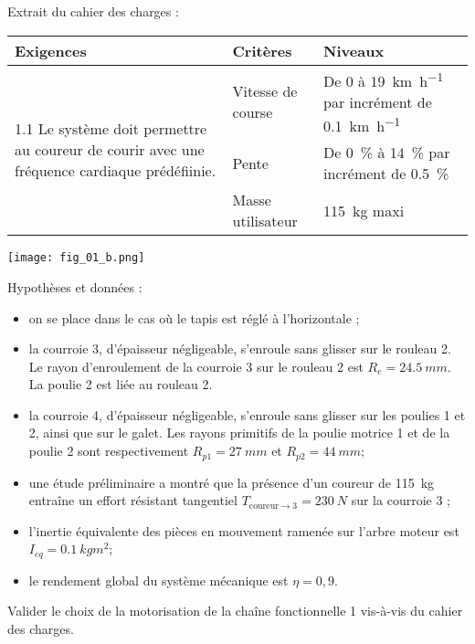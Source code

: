 
Extrait du cahier des charges :
\begin{table*}[!h]
\centering
\begin{tabular}{p{6cm}p{3cm}p{7cm}}
\hline
\textbf{Exigences} & \textbf{Critères} & \textbf{Niveaux} \\
\hline
\multirow{3}{6cm}{1.1 Le système doit permettre au coureur de courir avec une fréquence cardiaque prédéfiinie.} &
Vitesse de course & De 0 à \SI{19}{km.h^{-1}} par incrément de \SI{0,1}{km.h^{-1}}   \\
& Pente & De 0\, \% à \SI{14}{\%} par incrément de \SI{0,5}{\%}   \\
& Masse utilisateur & \SI{115}{kg} maxi \\
\hline
\end{tabular}
\end{table*}

\begin{marginfigure} 
\texttt{[image: fig\_01\_b.png]}
\end{marginfigure}
Hypothèses et données :
\begin{itemize}
\item on se place dans le cas où le tapis est réglé à l’horizontale ;
\item la courroie 3, d’épaisseur négligeable, s’enroule sans glisser sur le rouleau 2. Le rayon d’enroulement
de la courroie 3 sur le rouleau 2 est $R_e=\SI{24,5}{mm}$. La poulie 2 est liée au rouleau 2.
\item la courroie 4, d’épaisseur négligeable, s’enroule sans glisser sur les poulies 1 et 2, ainsi que sur le galet.
Les rayons primitifs de la poulie motrice 1 et de la poulie 2 sont respectivement $R_{p1}=\SI{27}{mm}$ et
$R_{p2}=\SI{44}{mm}$;
\item une étude préliminaire a montré que la présence d’un coureur de \SI{115}{kg} entraîne un effort résistant
tangentiel $T_{\text{coureur}\to 3}=\SI{230}{N}$ sur la courroie 3 ;
\item l’inertie équivalente des pièces en mouvement ramenée sur l’arbre moteur est $I_{eq}=\SI{0,1}{kg m^2}$;
\item le rendement global du système mécanique est $\eta=0,9$.
\end{itemize}


\begin{obj}
Valider le choix de la motorisation de la chaîne fonctionnelle 1 vis-à-vis du cahier des charges.
\end{obj}
\fi


